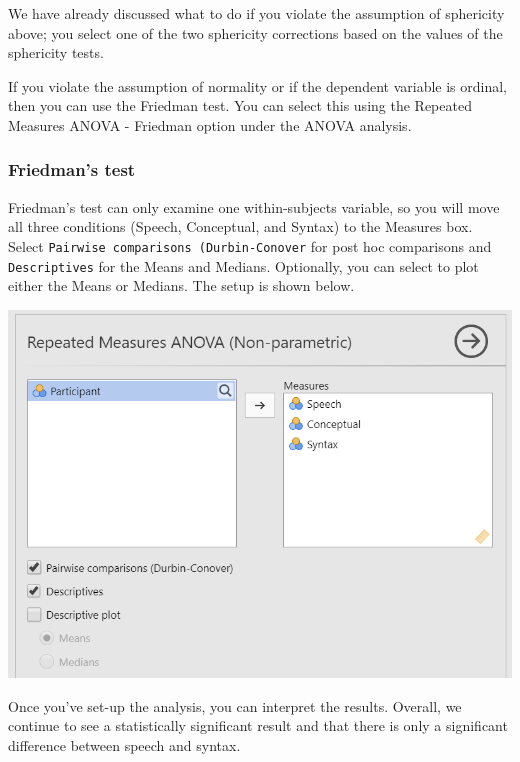 \documentclass[
]{book}
\begin{document}
We have already discussed what to do if you violate the assumption of sphericity above; you select one of the two sphericity corrections based on the values of the sphericity tests.

If you violate the assumption of normality or if the dependent variable is ordinal, then you can use the Friedman test. You can select this using the Repeated Measures ANOVA - Friedman option under the ANOVA analysis.

\hypertarget{friedmans-test}{%
\subsubsection{Friedman's test}\label{friedmans-test}}

Friedman's test can only examine one within-subjects variable, so you will move all three conditions (Speech, Conceptual, and Syntax) to the Measures box. Select \texttt{Pairwise\ comparisons\ (Durbin-Conover} for post hoc comparisons and \texttt{Descriptives} for the Means and Medians. Optionally, you can select to plot either the Means or Medians. The setup is shown below.

\includegraphics{images/05-repeated-measures-anova/rm-anova_friedman_setup.png}

Once you've set-up the analysis, you can interpret the results. Overall, we continue to see a statistically significant result and that there is only a significant difference between speech and syntax.
\end{document}

